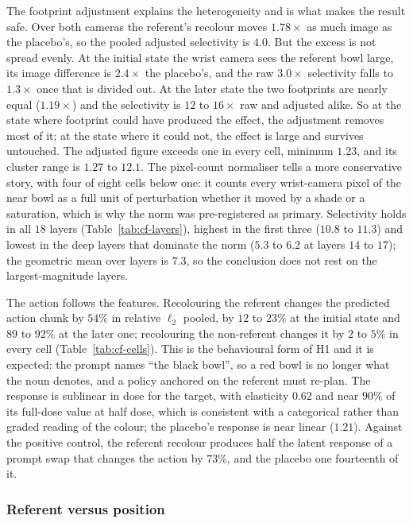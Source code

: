 The footprint adjustment explains the heterogeneity and is what makes the
result safe. Over both cameras the referent's recolour moves $1.78\times$ as
much image as the placebo's, so the pooled adjusted selectivity is $4.0$. But
the excess is not spread evenly. At the initial state the wrist camera sees the
referent bowl large, its image difference is $2.4\times$ the placebo's, and the
raw $3.0\times$ selectivity falls to $1.3\times$ once that is divided out. At
the later state the two footprints are nearly equal ($1.19\times$) and the
selectivity is $12$ to $16\times$ raw and adjusted alike. So at the state where
footprint could have produced the effect, the adjustment removes most of it;
at the state where it could not, the effect is large and survives untouched.
The adjusted figure exceeds one in every cell, minimum $1.23$, and its cluster
range is $1.27$ to $12.1$. The pixel-count normaliser tells a more conservative
story, with four of eight cells below one: it counts every wrist-camera pixel
of the near bowl as a full unit of perturbation whether it moved by a shade or
a saturation, which is why the norm was pre-registered as primary. Selectivity
holds in all $18$ layers
(Table~\ref{tab:cf-layers}), highest in the first three ($10.8$ to $11.3$) and
lowest in the deep layers that dominate the norm ($5.3$ to $6.2$ at layers $14$
to $17$); the geometric mean over layers is $7.3$, so the conclusion does not
rest on the largest-magnitude layers.

The action follows the features. Recolouring the referent changes the predicted
action chunk by $54\%$ in relative $\ell_2$ pooled, by $12$ to $23\%$ at the
initial state and $89$ to $92\%$ at the later one; recolouring the non-referent
changes it by $2$ to $5\%$ in every cell (Table~\ref{tab:cf-cells}). This is the behavioural form
of H1 and it is expected: the prompt names ``the black bowl'', so a red bowl
is no longer what the noun denotes, and a policy anchored on the referent
must re-plan. The response is sublinear in dose for the target, with elasticity
$0.62$ and near $90\%$ of its full-dose value at half dose, which is consistent
with a categorical rather than graded reading of the colour; the placebo's
response is near linear ($1.21$). Against the positive control, the referent
recolour produces half the latent response of a prompt swap that changes the
action by $73\%$, and the placebo one fourteenth of it.

\subsubsection{Referent versus position}

